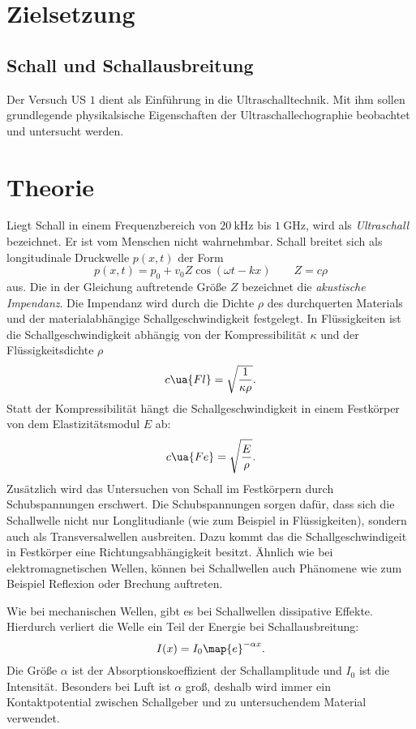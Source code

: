 \setcounter{page}{1}
\section*{Zielsetzung}

\subsection{Schall und Schallausbreitung}
Der Versuch US $1$ dient als Einführung in die Ultraschalltechnik.
Mit ihm sollen grundlegende physikalsische Eigenschaften der
Ultraschallechographie beobachtet und untersucht werden.
\section{Theorie}
Liegt Schall in einem Frequenzbereich von $\SI{20}{\kilo\hertz}$ bis $\SI{1}{\giga\hertz}$,
wird als \emph{Ultraschall} bezeichnet. Er ist vom Menschen nicht wahrnehmbar.
Schall breitet sich als longitudinale Druckwelle $p(x,t)$ der Form
\begin{equation*}
  p(x,t)=p_0+v_0 Z \cos(\omega t - kx) \qquad Z=c\rho
\end{equation*}
aus. Die in der Gleichung auftretende Größe $Z$ bezeichnet die \emph{akustische Impendanz}.
Die Impendanz wird durch die Dichte $\rho$ des durchquerten Materials und der
materialabhängige Schallgeschwindigkeit festgelegt.
In Flüssigkeiten ist die Schallgeschwindigkeit abhängig von der
Kompressibilität $\kappa$ und der Flüssigkeitsdichte $\rho$
\begin{equation*}
  c\ua{Fl}=\sqrt{\frac{1}{\kappa\rho}}.
\end{equation*}
Statt der Kompressibilität hängt die Schallgeschwindigkeit in einem Festkörper von
dem Elastizitätsmodul $E$ ab:
\begin{equation*}
  c\ua{Fe}=\sqrt{\frac{E}{\rho}}.
\end{equation*}
Zusätzlich wird das Untersuchen von Schall im Festkörpern durch Schubspannungen
erschwert. Die Schubspannungen sorgen dafür, dass sich die Schallwelle nicht nur
Longlitudianle (wie zum Beispiel in Flüssigkeiten), sondern auch als
Transversalwellen ausbreiten.
Dazu kommt das die Schallgeschwindigeit in Festkörper eine Richtungsabhängigkeit
besitzt.
Ähnlich wie bei elektromagnetischen Wellen, können bei Schallwellen auch
Phänomene wie zum Beispiel Reflexion oder Brechung auftreten.

Wie bei mechanischen Wellen, gibt es bei Schallwellen dissipative Effekte.
Hierdurch verliert die Welle ein Teil der Energie bei Schallausbreitung:
\begin{equation}
  \label{eq:abfall}
  I(x)=I_0\map{e}^{-\alpha x}.
\end{equation}
Die Größe $\alpha$ ist der Absorptionskoeffizient der Schallamplitude und $I_0$ ist die
Intensität.
Besonders bei Luft ist $\alpha$ groß, deshalb wird immer ein Kontaktpotential
zwischen Schallgeber und zu untersuchendem Material verwendet.

